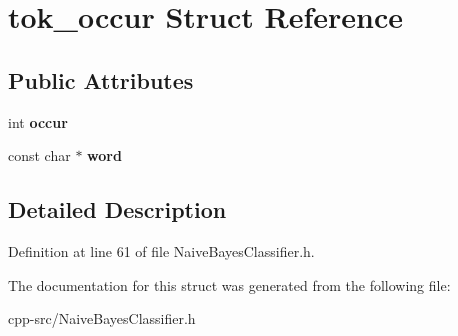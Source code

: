 \hypertarget{structtok__occur}{\section{tok\-\_\-occur Struct Reference}
\label{structtok__occur}
}
\subsection*{Public Attributes}
\begin{DoxyCompactItemize}
\item 
\hypertarget{structtok__occur_ad9b0e2b782c5f8617fb7dae0fd33fe86}{int {\bfseries occur}}\label{structtok__occur_ad9b0e2b782c5f8617fb7dae0fd33fe86}

\item 
\hypertarget{structtok__occur_a9d5a659607a49c50f899b56b08af037e}{const char $\ast$ {\bfseries word}}\label{structtok__occur_a9d5a659607a49c50f899b56b08af037e}

\end{DoxyCompactItemize}


\subsection{Detailed Description}


Definition at line 61 of file Naive\-Bayes\-Classifier.\-h.



The documentation for this struct was generated from the following file\-:\begin{DoxyCompactItemize}
\item 
cpp-\/src/Naive\-Bayes\-Classifier.\-h\end{DoxyCompactItemize}
